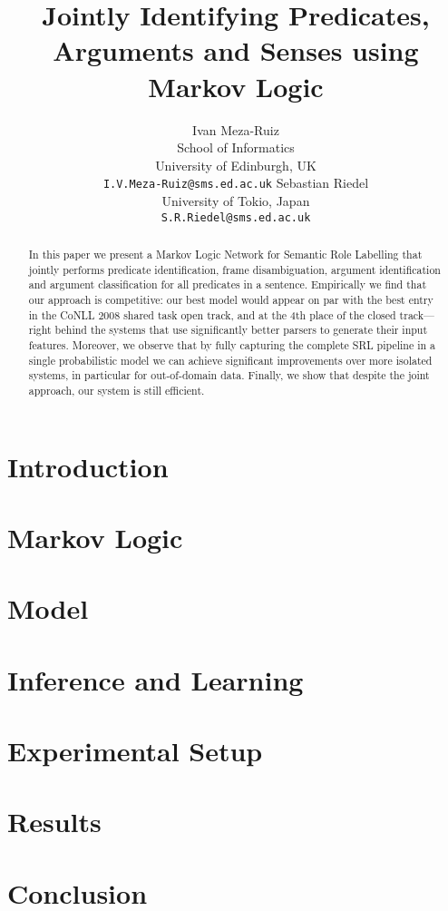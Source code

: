 \documentclass[11pt]{article}
\title{Jointly Identifying Predicates, Arguments and Senses using Markov Logic}
\author{Ivan Meza-Ruiz \\
  School of Informatics\\
  University of Edinburgh, UK\\
  {\tt I.V.Meza-Ruiz@sms.ed.ac.uk} \And
  Sebastian Riedel\\
  University of Tokio, Japan\\
  {\tt S.R.Riedel@sms.ed.ac.uk}
  }
\begin{document}

\maketitle

\begin{abstract}
In this paper we present a Markov Logic Network for Semantic Role
Labelling that jointly performs predicate identification, frame
disambiguation, argument identification and argument classification
for all predicates in a sentence. Empirically we find that our
approach is competitive: our best model would appear on par
with the best entry in the CoNLL 2008 shared task open track, and at
the 4th place of the closed track---right behind the systems that use
significantly better parsers to generate their input features.
Moreover, we observe
that by fully capturing the complete SRL pipeline in a single
probabilistic model we can achieve significant improvements over more isolated systems, in particular for out-of-domain
data. Finally, we show that despite the joint approach, our
system is still efficient. 
\end{abstract} 


\section{Introduction}




\section{Markov Logic} \label{sec:markovlogic}



\section{Model} \label{sec:model} 



\section{Inference and Learning}\label{sec:inference}




\section{Experimental Setup}
\label{sec:experiments}


\section{Results}\label{sec:results}



\section{Conclusion} \label{sec:conclusion}





\end{document}

